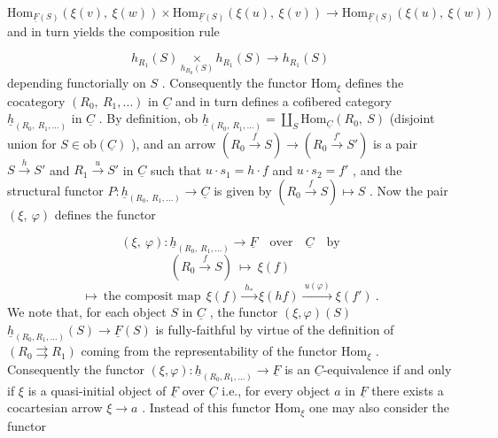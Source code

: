 \begin{equation*}
\mathrm{Hom}_{\underline{F}(S)}(\xi(v),\ \xi(w)) \times \mathrm{Hom}_{\underline{F}(S)}(\xi(u),\ \xi(v)) \to \mathrm{Hom}_{\underline{F}(S)}(\xi(u),\ \xi(w))
\end{equation*}
and in turn yields the composition rule

\begin{equation*}
h_{R_1}(S) \underset{h_{R_0}(S)}{\times} h_{R_1}(S) \to h_{R_1}(S)
\end{equation*}
depending functorially on $S$ . Consequently the functor $\mathrm{Hom}_{\xi}$ defines the cocategory $(R_0,\ R_1,\ldots)$ in $\underline{C}$ and in turn defines a cofibered category $\underline{h}_{(R_0,\ R_1,\ldots)}$ in $\underline{C}$ . By definition, ob $\underline{h}_{(R_0,\ R_1,\ldots)} = \coprod_{S} \mathrm{Hom}_{\underline{C}}(R_0,\ S)$ (disjoint union for $S \in \mathrm{ob}(\underline{C})$ ), and an arrow $(R_0 \xrightarrow{f} S) \to (R_0 \xrightarrow{f'} S')$ is a pair $S \xrightarrow{h} S'$ and $R_1 \xrightarrow{u} S'$ in $\underline{C}$ such that $u \cdot s_1 = h \cdot f$ and $u \cdot s_2 = f'$ , and the structural functor $P : \underline{h}_{(R_0,\ R_1,\ldots)} \to \underline{C}$ is given by $(R_0 \xrightarrow{f} S) \longmapsto S$ . Now the pair $(\xi,\ \varphi)$ defines the functor

\begin{equation*}
(\xi,\ \varphi) : \underline{h}_{(R_0,\ R_1,\ldots)} \to \underline{F} \quad \text{over} \quad \underline{C} \quad \text{by}
\end{equation*}
\begin{equation*}
(R_0 \xrightarrow{f} S) \ \longmapsto\ \xi(f)
\end{equation*}
\begin{equation*}
[(R_0 \xrightarrow{f} S) \xrightarrow{\ (h,u)\ } (R_0 \to S')] \longmapsto \ \text{the composit map}\ \ \xi(f) \xrightarrow{\ h_{*}\ } \xi(hf) \xrightarrow{\ u(\varphi)\ } \xi(f') \ .
\end{equation*}
We note that, for each object $S$ in $\underline{C}$ , the functor $(\xi,\varphi)(S)$   $\underline{h}_{(R_0,R_1,\ldots)}(S) \to \underline{F}(S)$ is fully-faithful by virtue of the definition of $(R_0 \rightrightarrows R_1)$ coming from the representability of the functor $\mathrm{Hom}_{\xi}$ . Consequently the functor $(\xi,\varphi) : \underline{h}_{(R_0,R_1,\ldots)} \to \underline{F}$ is an $\underline{C}$-equivalence if and only if $\xi$ is a quasi-initial object of $\underline{F}$ over $\underline{C}$ i.e., for every object $a$ in $\underline{F}$ there exists a cocartesian arrow $\xi \to a$ . Instead of this functor $\mathrm{Hom}_{\xi}$ one may also consider the functor

